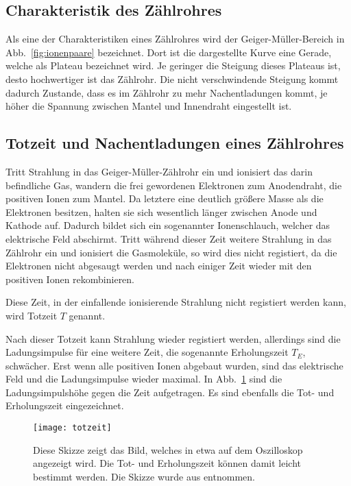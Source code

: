 \subsection{Charakteristik des Zählrohres}
%

Als eine der Charakteristiken eines Zählrohres wird der
Geiger-Müller-Bereich in Abb.~\ref{fig:ionenpaare} bezeichnet. Dort ist
die dargestellte Kurve eine Gerade, welche als Plateau bezeichnet
wird. Je geringer die Steigung dieses Plateaus ist, desto hochwertiger
ist das Zählrohr. Die nicht verschwindende Steigung kommt dadurch
Zustande, dass es im Zählrohr zu mehr Nachentladungen kommt, je höher
die Spannung zwischen Mantel und Innendraht eingestellt ist.
%
\subsection{Totzeit und Nachentladungen eines Zählrohres}
%

Tritt Strahlung in das Geiger-Müller-Zählrohr ein und ionisiert das
darin befindliche Gas, wandern die frei gewordenen Elektronen zum
Anodendraht, die positiven Ionen zum Mantel. Da letztere eine deutlich
größere Masse als die Elektronen besitzen, halten sie sich wesentlich
länger zwischen Anode und Kathode auf. Dadurch bildet sich ein
sogenannter Ionenschlauch, welcher das elektrische Feld abschirmt. Tritt
während dieser Zeit weitere Strahlung in das Zählrohr ein und ionisiert
die Gasmoleküle, so wird dies nicht registiert, da die Elektronen nicht
abgesaugt werden und nach einiger Zeit wieder mit den positiven Ionen
rekombinieren.

Diese Zeit, in der einfallende ionisierende Strahlung nicht registiert
werden kann, wird Totzeit $T$ genannt.

Nach dieser Totzeit kann Strahlung wieder registiert werden, allerdings
sind die Ladungsimpulse für eine weitere Zeit, die sogenannte
Erholungszeit $T_E$, schwächer.  Erst wenn alle positiven Ionen abgebaut
wurden, sind das elektrische Feld und die Ladungsimpulse wieder maximal.
In Abb.~\ref{fig:totzeit} sind die Ladungsimpulshöhe gegen die Zeit
aufgetragen. Es sind ebenfalls die Tot- und Erholungszeit eingezeichnet.
%
\begin{figure}
  \centering
  \texttt{[image: totzeit]}
  \caption{Diese Skizze zeigt das Bild, welches in etwa
    auf dem Oszilloskop angezeigt wird. Die Tot- und
    Erholungszeit können damit leicht bestimmt werden.
    Die Skizze wurde aus \textcite{v703} entnommen.}
  \label{fig:totzeit}
\end{figure}
%

